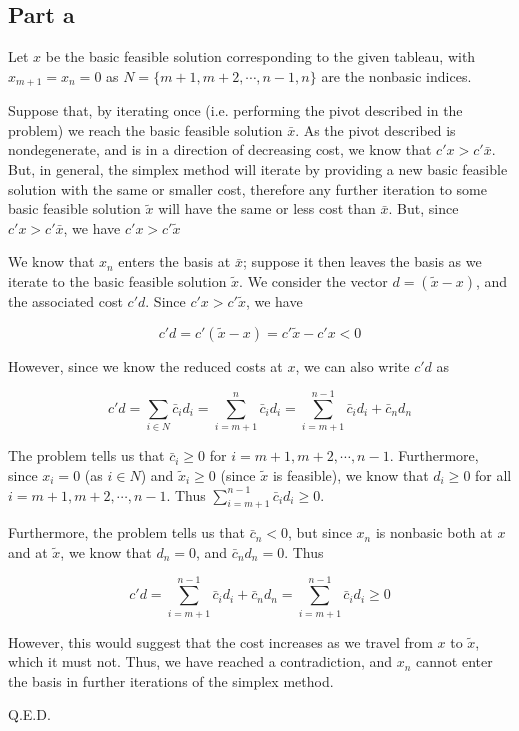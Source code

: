\subsection*{Part a}

Let $x$ be the basic feasible solution corresponding to the given tableau, with $x_{m+1}=x_n=0$ as $N=\{m+1, m+2, \cdots , n-1, n\}$ are the nonbasic indices. 

Suppose that, by iterating once (i.e. performing the pivot described in the problem) we reach the basic feasible solution $\bar{x}$. As the pivot described is nondegenerate, and is in a direction of decreasing cost, we know that $c'x>c'\bar{x}$. But, in general, the simplex method will iterate by providing a new basic feasible solution with the same or smaller cost, therefore any further iteration to some basic feasible solution $\tilde{x}$ will have the same or less cost than $\bar{x}$. But, since $c'x>c'\bar{x}$, we have $c'x>c'\tilde{x}$

We know that $x_n$ enters the basis at $\bar{x}$; suppose it then leaves the basis as we iterate to the basic feasible solution $\tilde{x}$. We consider the vector $d=(\tilde{x}-x)$, and the associated cost $c'd$. Since $c'x>c'\tilde{x}$, we have

$$
c'd=c'(\tilde{x}-x)=c'\tilde{x}-c'x<0
$$

However, since we know the reduced costs at $x$, we can also write $c'd$ as

$$
c'd=\sum_{i\in N}\bar{c}_id_i=\sum_{i=m+1}^n\bar{c}_id_i=\sum_{i=m+1}^{n-1}\bar{c}_id_i+\bar{c}_nd_n
$$

The problem tells us that $\bar{c}_i\geq 0$ for $i=m+1, m+2, \cdots, n-1$. Furthermore, since $x_i=0$ (as $i\in N$) and $\tilde{x}_i\geq 0$ (since $\tilde{x}$ is feasible), we know that $d_i\geq 0$ for all $i=m+1, m+2, \cdots, n-1$. Thus $\sum_{i=m+1}^{n-1}\bar{c}_id_i\geq 0$.

Furthermore, the problem tells us that $\bar{c}_n<0$, but since $x_n$ is nonbasic both at $x$ and at $\tilde{x}$, we know that $d_n=0$, and $\bar{c}_nd_n=0$. Thus

$$
c'd=\sum_{i=m+1}^{n-1}\bar{c}_id_i+\bar{c}_nd_n=\sum_{i=m+1}^{n-1}\bar{c}_id_i \geq 0
$$

However, this would suggest that the cost increases as we travel from $x$ to $\tilde{x}$, which it must not. Thus, we have reached a contradiction, and $x_n$ cannot enter the basis in further iterations of the simplex method.

Q.E.D.

